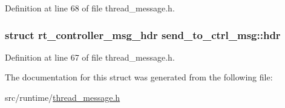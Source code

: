 Definition at line 68 of file thread\-\_\-message.\-h.

\hypertarget{structsend__to__ctrl__msg_a0081ea72ec0c3835e350ff584a3a4224}{
\subsubsection[{hdr}]{\setlength{\rightskip}{0pt plus 5cm}struct {\bf rt\-\_\-controller\-\_\-msg\-\_\-hdr} send\-\_\-to\-\_\-ctrl\-\_\-msg\-::hdr}}\label{structsend__to__ctrl__msg_a0081ea72ec0c3835e350ff584a3a4224}


Definition at line 67 of file thread\-\_\-message.\-h.



The documentation for this struct was generated from the following file\-:\begin{DoxyCompactItemize}
\item 
src/runtime/\hyperlink{thread__message_8h}{thread\-\_\-message.\-h}\end{DoxyCompactItemize}
